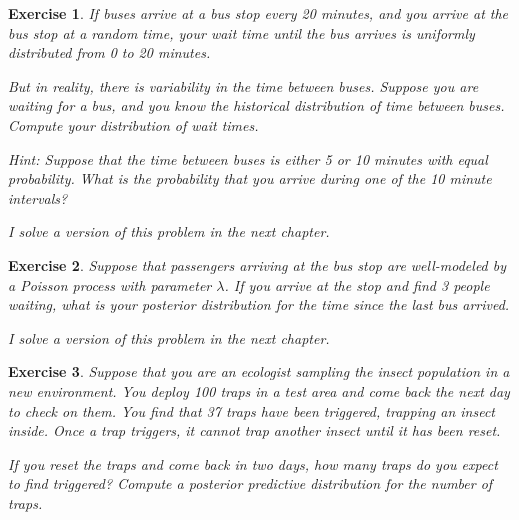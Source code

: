 \documentclass[12pt]{book}
\theoremstyle{exercise}
\newtheorem{exercise}{Exercise}[chapter]
\begin{document}
\begin{exercise}

If buses arrive at a bus stop every 20 minutes, and you
arrive at the bus stop at a random time, your wait time until
the bus arrives is uniformly distributed from 0 to 20 minutes.

But in reality, there is variability in the time between
buses.  Suppose you are waiting for a bus, and you know the historical
distribution of time between buses.  Compute your distribution
of wait times.

Hint: Suppose that the time between buses is either
5 or 10 minutes with equal probability.  What is the probability
that you arrive during one of the 10 minute intervals?

I solve a version of this problem in the next chapter.

\end{exercise}


\begin{exercise}

Suppose that passengers arriving at the bus stop are well-modeled
by a Poisson process with parameter $\lambda$.  If you arrive at the
stop and find 3 people waiting, what is your posterior distribution
for the time since the last bus arrived.

I solve a version of this problem in the next chapter.

\end{exercise}


\begin{exercise}

Suppose that you are an ecologist sampling the insect population in
a new environment.  You deploy 100 traps in a test area and come back
the next day to check on them.  You find that 37 traps have been
triggered, trapping an insect inside.  Once a trap triggers, it
cannot trap another insect until it has been reset.

If you reset the traps and come back in two days, how many traps
do you expect to find triggered?  Compute a posterior predictive
distribution for the number of traps.

\end{exercise}
\end{document}
